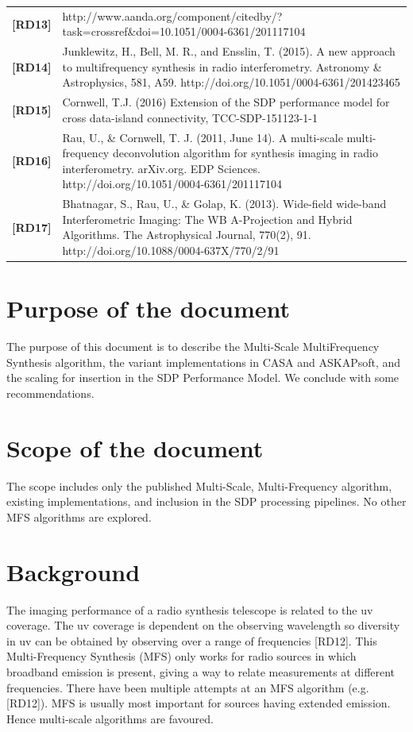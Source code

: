\documentclass[11pt,a4paper,variablewidth]{article}
\begin{document}
\begin{center}
\begin{tabularx}{\textwidth}{|l|X|}
   {\bf [RD13]} & http://www.aanda.org/component/citedby/?task=crossref\&doi=10.1051/0004-6361/201117104 \\  
   {\bf [RD14]} & Junklewitz, H., Bell, M. R., and Ensslin, T. (2015). A new approach to multifrequency synthesis in radio interferometry. Astronomy \& Astrophysics, 581, A59. http://doi.org/10.1051/0004-6361/201423465 \\
   {\bf [RD15]} & Cornwell, T.J. (2016) Extension of the SDP performance model for cross data-island connectivity, TCC-SDP-151123-1-1 \\
	{\bf [RD16]} & Rau, U., \& Cornwell, T. J. (2011, June 14). A multi-scale multi-frequency deconvolution algorithm for synthesis imaging in radio interferometry. arXiv.org. EDP Sciences. http://doi.org/10.1051/0004-6361/201117104   \\
	{\bf [RD17]} & Bhatnagar, S., Rau, U., \& Golap, K. (2013). Wide-field wide-band Interferometric Imaging: The WB A-Projection and Hybrid Algorithms. The Astrophysical Journal, 770(2), 91. http://doi.org/10.1088/0004-637X/770/2/91 \\
	\hline
 \end{tabularx}
\end{center}

\clearpage
\section{Purpose of the document}


The purpose of this document is to describe the Multi-Scale MultiFrequency Synthesis algorithm, the variant implementations in CASA and ASKAPsoft, and the scaling for insertion in the SDP Performance Model. We conclude with some recommendations.

\section{Scope of the document}

The scope includes only the published Multi-Scale, Multi-Frequency algorithm, existing implementations, and inclusion in the SDP processing pipelines. No other MFS algorithms are explored.

\section{Background}

The imaging performance of a radio synthesis telescope is related to the uv coverage. The uv coverage is dependent on the observing wavelength so diversity in uv can be obtained by observing over a range of frequencies [RD12]. This Multi-Frequency Synthesis (MFS) only works for radio sources in which broadband emission is present, giving a way to relate measurements at different frequencies. There have been multiple attempts at an MFS algorithm (e.g. [RD12]). MFS is usually most important for sources having extended emission. Hence multi-scale algorithms are favoured.
\end{document}
